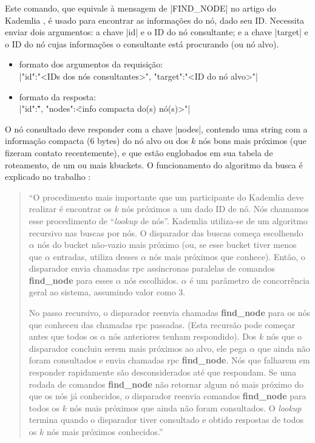 
\newpage
{}

Este comando, que equivale à mensagem de \bverb|FIND_NODE| no artigo do Kademlia
\cite{artigo:kademlia}, é usado para encontrar as informações do nó, dado seu ID.
Necessita enviar dois argumentos: a chave \bverb|id| e o ID do nó consultante; e a chave
\bverb|target| e o ID do nó cujas informações o consultante está procurando (ou nó
alvo).

\begin{itemize}
    \item formato dos argumentos da requisição: \\
        \sverb|{"id":"<IDs dos nós consultantes>", "target":"<ID do nó alvo>"}|

    \item formato da resposta: \\
        \sverb|{"id":\"<IDs dos nós consultados>", "nodes":\"<info compacta do(s) nó(s)>"}|
\end{itemize}

O nó consultado deve responder com a chave \bverb|nodes|, contendo uma \gls*{string} com
a informação compacta (6 bytes) do nó alvo ou dos $k$ nós bons mais próximos (que
fizeram contato recentemente), e que estão englobados em sua tabela de roteamento, de um
ou mais \glspl*{kbucket}. O funcionamento do algoritmo da busca é explicado no trabalho
\cite{artigo:kademlia-springer}:

\blockquote{``O procedimento mais importante que um participante do Kademlia deve
realizar é encontrar os $k$ nós próximos a um dado ID de nó. Nós chamamos esse
procedimento de \enquote{\emph{lookup} de nós}. Kademlia utiliza-se de um algoritmo
recursivo nas buscas por nós. O disparador das buscas começa escolhendo $\alpha$ nós do
\gls*{bucket} não-vazio mais próximo (ou, se esse \gls*{bucket} tiver menos que $\alpha$
entradas, utiliza desses $\alpha$ nós mais próximos que conhece). Então, o disparador
envia chamadas \gls*{rpc} assíncronas paralelas de comandos \textbf{find\_node} para
esses $\alpha$ nós escolhidos. $\alpha$ é um parâmetro de concorrência geral ao sistema,
assumindo valor como 3.

No passo recursivo, o disparador reenvia chamadas \textbf{find\_node} para os nós que
conheceu das chamadas \gls*{rpc} passadas. (Esta recursão pode começar antes que todos
os $\alpha$ nós anteriores tenham respondido). Dos $k$ nós que o disparador concluiu
serem mais próximos ao alvo, ele pega $\alpha$ que ainda não foram consultados e envia
chamadas \gls*{rpc} \textbf{find\_node}. Nós que falharem em responder rapidamente são
desconsiderados até que respondam. Se uma rodada de comandos \textbf{find\_node} não
retornar algum nó mais próximo do que os nós já conhecidos, o disparador reenvia
comandos \textbf{find\_node} para todos os $k$ nós mais próximos que ainda não foram
consultados. O \emph{lookup} termina quando o disparador tiver consultado e obtido
respostas de todos os $k$ nós mais próximos conhecidos.''}

